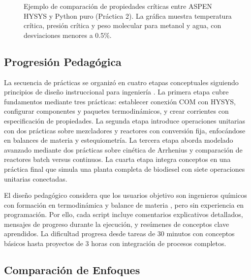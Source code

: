\documentclass{syx7}
\begin{document}
\begin{figure}[htb!]
	\centering
	\caption{Ejemplo de comparación de propiedades críticas entre ASPEN HYSYS y Python puro (Práctica 2). La gráfica muestra temperatura crítica, presión crítica y peso molecular para metanol y agua, con desviaciones menores a 0.5\%.}
	\label{fig:comparacion_propiedades}
\end{figure}

\subsection{Progresión Pedagógica}

La secuencia de prácticas se organizó en cuatro etapas conceptuales siguiendo principios de diseño instruccional para ingeniería \cite{seider2016product}. La primera etapa cubre fundamentos mediante tres prácticas: establecer conexión COM con HYSYS, configurar componentes y paquetes termodinámicos, y crear corrientes con especificación de propiedades. La segunda etapa introduce operaciones unitarias con dos prácticas sobre mezcladores y reactores con conversión fija, enfocándose en balances de materia y estequiometría. La tercera etapa aborda modelado avanzado mediante dos prácticas sobre cinética de Arrhenius \cite{fogler2016elements} y comparación de reactores batch versus continuos. La cuarta etapa integra conceptos en una práctica final que simula una planta completa de biodiesel con siete operaciones unitarias conectadas.

El diseño pedagógico considera que los usuarios objetivo son ingenieros químicos con formación en termodinámica y balance de materia \cite{fogler2016elements}, pero sin experiencia en programación. Por ello, cada script incluye comentarios explicativos detallados, mensajes de progreso durante la ejecución, y resúmenes de conceptos clave aprendidos. La dificultad progresa desde tareas de 30 minutos con conceptos básicos hasta proyectos de 3 horas con integración de procesos completos.

\subsection{Comparación de Enfoques}
\end{document}
